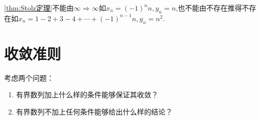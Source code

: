 \begin{red}
    \begin{remark}
        \cref{thm:Stolz定理}不能由$\infty\Longrightarrow\infty$如$x_n=\left(-1\right)^nn,y_n=n$,也不能由不存在推得不存在如$x_n=1-2+3-4+\cdots+\left(-1\right)^{n-1}n,y_n=n^2.$
    \end{remark}
\end{red}
\newpage
\section{收敛准则}
\begin{red}
    \begin{remark}
        考虑两个问题：\begin{enumerate}[label={\textup{(\arabic*)}}]
            \item 有界数列加上什么样的条件能够保证其收敛？
            \item 有界数列不加上任何条件能够给出什么样的结论？
        \end{enumerate}
    \end{remark}
\end{red}
